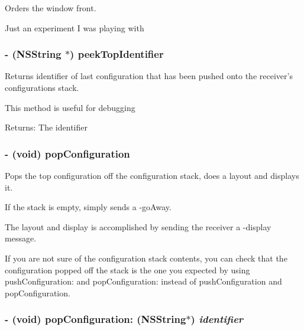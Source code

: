 Orders the window front. 

Just an experiment I was playing with \hypertarget{interface_s_s_y_alert_c88faf997cadf44f5193db9d1c10a79f}{
\subsubsection[{peekTopIdentifier}]{\setlength{\rightskip}{0pt plus 5cm}- (NSString $\ast$) peekTopIdentifier }}
\label{interface_s_s_y_alert_c88faf997cadf44f5193db9d1c10a79f}


Returns identifier of last configuration that has been pushed onto the receiver's configurations stack. 

This method is useful for debugging \begin{Desc}
\item[Returns:]The identifier \end{Desc}
\hypertarget{interface_s_s_y_alert_f945f585830f7d0573e7bbc96749e935}{
\subsubsection[{popConfiguration}]{\setlength{\rightskip}{0pt plus 5cm}- (void) popConfiguration }}
\label{interface_s_s_y_alert_f945f585830f7d0573e7bbc96749e935}


Pops the top configuration off the configuration stack, does a layout and displays it. 

If the stack is empty, simply sends a -goAway.

The layout and display is accomplished by sending the receiver a -display message.

If you are not sure of the configuration stack contents, you can check that the configuration popped off the stack is the one you expected by using pushConfiguration: and popConfiguration: instead of pushConfiguration and popConfiguration. \hypertarget{interface_s_s_y_alert_5d8ab50f128a7b29cdf85c9b7290814e}{
\subsubsection[{popConfiguration:}]{\setlength{\rightskip}{0pt plus 5cm}- (void) popConfiguration: (NSString$\ast$) {\em identifier}}}
\label{interface_s_s_y_alert_5d8ab50f128a7b29cdf85c9b7290814e}


